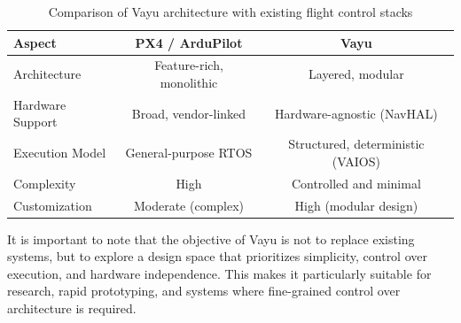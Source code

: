 \begin{table}[H]
    \centering
    \begin{tabular}{|l|c|c|}
        \hline
        \textbf{Aspect} & \textbf{PX4 / ArduPilot} & \textbf{Vayu} \\
        \hline
        Architecture & Feature-rich, monolithic & Layered, modular \\
        \hline
        Hardware Support & Broad, vendor-linked & Hardware-agnostic (NavHAL) \\
        \hline
        Execution Model & General-purpose RTOS & Structured, deterministic (VAIOS) \\
        \hline
        Complexity & High & Controlled and minimal \\
        \hline
        Customization & Moderate (complex) & High (modular design) \\
        \hline
    \end{tabular}
    \caption{Comparison of Vayu architecture with existing flight control stacks}
    \label{tab:comparison}
\end{table}

It is important to note that the objective of Vayu is not to replace existing systems, but to explore a design space that prioritizes simplicity, control over execution, and hardware independence. This makes it particularly suitable for research, rapid prototyping, and systems where fine-grained control over architecture is required.